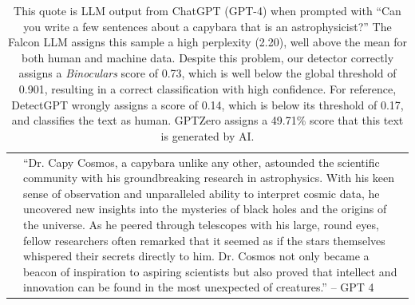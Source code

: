 \documentclass{article}
\begin{document}
\begin{table}[ht!]
\centering
\begin{tcolorbox}[left=0mm,right=0mm,width=\textwidth,bottom=0mm,top=0mm,arc=0mm,auto outer arc]
\begin{tabular}{m{0.1in}m{1.5in}m{1.5in}m{1.5in}}
     &\multicolumn{3}{p{5.9in}}{\looseness -1``Dr. Capy Cosmos, a capybara unlike any other, astounded the scientific community with his groundbreaking research in astrophysics. With his keen sense of observation and unparalleled ability to interpret cosmic data, he uncovered new insights into the mysteries of black holes and the origins of the universe. As he peered through telescopes with his large, round eyes, fellow researchers often remarked that it seemed as if the stars themselves whispered their secrets directly to him. Dr. Cosmos not only became a beacon of inspiration to aspiring scientists but also proved that intellect and innovation can be found in the most unexpected of creatures.'' -- GPT 4}\\
\end{tabular}
\caption{This quote is LLM output from ChatGPT (GPT-4) when prompted with ``Can you write a few sentences about a capybara that is an astrophysicist?'' The Falcon LLM assigns this sample a high perplexity (2.20), well above the mean for both human and machine data. Despite this problem, our detector correctly assigns a \emph{Binoculars} score of 0.73, which is well below the global threshold of 0.901, resulting in a correct classification with high confidence. For reference, DetectGPT wrongly assigns a score of 0.14, which is below its threshold of 0.17, and classifies the text as human. GPTZero assigns a 49.71\% score that this text is generated by AI. }
\end{tcolorbox}
\end{table}
\end{document}
